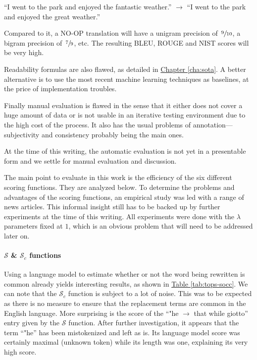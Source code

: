 \documentclass[a4paper, 11pt, onepage]{scrreprt}
\newcommand\tableref[1]{\hyperref[#1]{Table \ref*{#1}}}
\newcommand\chapterref[1]{\hyperref[#1]{Chapter \ref*{#1}}}
\begin{document}
“I went to the park and enjoyed the fantastic weather.” $\rightarrow$
“I went to the park and enjoyed the great weather.”

Compared to it, a NO-OP translation will have a unigram precision of
$\,\sfrac{9}{10}$, a bigram precision of $\,\sfrac{7}{9}$, etc. The
resulting BLEU, ROUGE and NIST scores will be very high.

Readability formulas are also flawed, as detailed
in \chapterref{cha:sota}. A better alternative is to use the most
recent machine learning techniques as baselines, at the price of
implementation troubles.

Finally manual evaluation is flawed in the sense that it either does
not cover a huge amount of data or is not usable in an iterative
testing environment due to the high cost of the process. It also has
the usual problems of annotation—subjectivity and consistency probably
being the main ones.

At the time of this writing, the automatic evaluation is not yet in a
presentable form and we settle for manual evaluation and discussion.

The main point to evaluate in this work is the efficiency of the six
different scoring functions. They are analyzed below. To determine the
problems and advantages of the scoring functions, an empirical study
was led with a range of news articles. This informal insight still has
to be backed up by further experiments at the time of this
writing. All experiments were done with the $\lambda$ parameters fixed
at $1$, which is an obvious problem that will need to be addressed
later on.

\paragraph*{$\mathcal{S}$ \& $\mathcal{S}_c$ functions}
\label{par:occ}

Using a language model to estimate whether or not the word being
rewritten is common already yields interesting results, as shown in
\tableref{tab:tops-socc}. We can note that the $\mathcal{S}_c$
function is subject to a lot of noise. This was to be expected as
there is no measure to ensure that the replacement terms are common in
the English language. More surprising is the score of the “"he
$\rightarrow$ that while giotto” entry given by the $\mathcal{S}$
function. After further investigation, it appears that the term “"he”
has been mistokenized and left as is. Its language model score was
certainly maximal (unknown token) while its length was one, explaining
its very high score.
\end{document}
